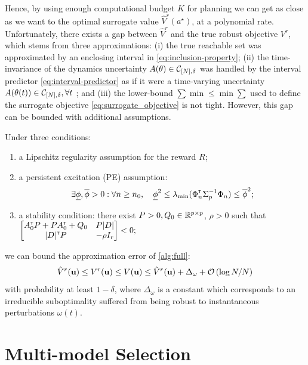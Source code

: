 \documentclass{article}
\begin{document}
Hence, by using enough computational budget $K$ for planning we can get as close as we want to the optimal surrogate value $\hat{V}^r(a^{\star})$, at a polynomial rate. Unfortunately, there exists a gap between $\hat{V}^r$ and the true robust objective $V^r$, which stems from three approximations: (i) the true reachable set was approximated by an enclosing interval in \eqref{eq:inclusion-property}; (ii) the time-invariance of the dynamics uncertainty $A(\theta)\in\mathcal{C}_{[N],\delta}$ was handled by the interval predictor \eqref{eq:interval-predictor} as if it were a time-varying uncertainty $A(\theta(t))\in\mathcal{C}_{[N],\delta},\forall t$ ; and (iii) the lower-bound $\sum\min\leq \min\sum$ used to define the surrogate objective \eqref{eq:surrogate_objective} is not tight. However, this gap can be bounded with additional assumptions.
\begin{theorem}
\label{thm:control-error}
Under three conditions:
\begin{enumerate}
	\item a Lipschitz regularity assumption for the reward $R$;
	\item a persistent excitation (PE) assumption:
	\begin{align*}
	\exists \underline{\phi},\overline{\phi}>0: \forall n\geq n_0,\quad \underline{\phi}^2 \leq \lambda_{\min}(\Phi_{n}^{\mathsf{\scriptscriptstyle T}}\Sigma_{p}^{-1}\Phi_{n}) \leq \overline{\phi}^2;
	\end{align*}
	\item a stability condition: there exist $P>0,Q_0\in\mathbb{R}^{p\times p}$, $\rho>0$ such that
	$\begin{bmatrix}
		A_0^{\mathsf{\scriptscriptstyle T}} P + P A_0^{\mathsf{\scriptscriptstyle T}} + Q_0 & P|D|  \\
		|D|^{\mathsf{\scriptscriptstyle T}} P & -\rho I_r \\
	\end{bmatrix}< 0;$
\end{enumerate}
 we can bound the approximation error of \autoref{alg:full}:
\begin{equation*}
\hat{V}^r(\mathbf{u}) \leq {V}^r(\mathbf{u}) \leq V(\mathbf{u}) \leq \hat{V}^r(\mathbf{u}) + \Delta_\omega + \mathcal{O}\left({\log N / N}\right)
\end{equation*}
with probability at least $1-\delta$, where $\Delta_\omega$ is a constant which corresponds to an irreducible suboptimality suffered from being robust to instantaneous perturbations $\omega(t)$.
\end{theorem}


\section{Multi-model Selection}
\label{sec:multi-model}
\end{document}

